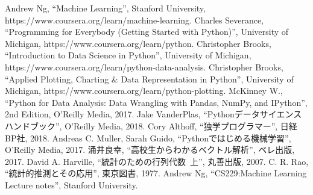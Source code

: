 \begin{thebibliography}{99}
 Andrew Ng, ``Machine Learning'', Stanford University, https://www.coursera.org/learn/machine-learning.
 Charles Severance, ``Programming for Everybody (Getting Started with Python)'', University of Michigan, https://www.coursera.org/learn/python.
 Christopher Brooks, ``Introduction to Data Science in Python'', University of Michigan, https://www.coursera.org/learn/python-data-analysis.
 Christopher Brooks, ``Applied Plotting, Charting \& Data Representation in Python'', University of Michigan, https://www.coursera.org/learn/python-plotting.
 McKinney W., ``Python for Data Analysis: Data Wrangling with Pandas, NumPy, and IPython'', 2nd Edition, O'Reilly Media, 2017.
 Jake VanderPlas, ``Pythonデータサイエンスハンドブック'', O'Reilly Media, 2018.
 Cory Althoff, ``独学プログラマー'', 日経BP社, 2018.
 Andreas C. Muller, Sarah Guido, ``Pythonではじめる機械学習'', O'Reilly Media, 2017.
 涌井良幸, ``高校生からわかるベクトル解析'', ベレ出版, 2017.
 David A. Harville, ``統計のための行列代数~上'', 丸善出版, 2007.
 C. R. Rao, ``統計的推測とその応用'', 東京図書, 1977.
 Andrew Ng, ``CS229:Machine Learning Lecture notes'', Stanford University.
\end{thebibliography}